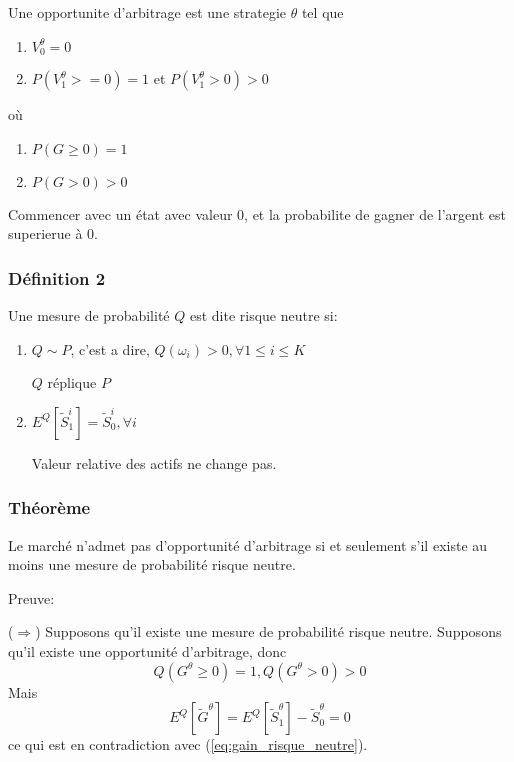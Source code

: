 \documentclass{article}
\theoremstyle{plain}
\theoremstyle{definition}
\begin{document}
Une opportunite d'arbitrage est une strategie $\theta$ tel que 
\begin{enumerate}
	\item  $V_0^\theta =0$
	\item $P(V_1^\theta >=0) = 1$ et $P(V_1^\theta>0)>0$ 
\end{enumerate}
o\`u
\begin{enumerate}
	\item $P(G\geq 0) = 1$
	\item $P(G>0) > 0$
\end{enumerate}

Commencer avec un \'etat avec valeur $0$, et la probabilite de gagner de l'argent est superierue \`a $0$.

\subsubsection{D\'efinition 2}

Une mesure de probabilit\'e $Q$ est dite risque neutre si:
\begin{enumerate}
	\item $Q\sim P$, c'est a dire, $Q(\omega_i)>0, \forall 1\leq i\leq K$
	
	$Q$ r\'eplique $P$
	
	\item $E^Q[\tilde{S}_1^i]=\tilde{S}_0^i, \forall i$
	
	Valeur relative des actifs ne change pas.
\end{enumerate}

\subsubsection{Th\'eor\`eme}
Le march\'e n'admet pas d'opportunit\'e d'arbitrage si et seulement s'il existe au moins une mesure de probabilit\'e risque neutre.

Preuve:

($\Rightarrow$) Supposons qu'il existe une mesure de probabilit\'e risque neutre. Supposons qu'il existe une opportunit\'e d'arbitrage, donc 
\begin{equation}
\label{eq:gain_risque_neutre}
Q(G^\theta\geq0)=1, Q(G^\theta>0)>0
\end{equation}
Mais
\begin{equation}
E^Q[\tilde{G}^\theta]=E^Q[\tilde{S}_1^\theta]-\tilde{S}_0^\theta=0
\end{equation}
ce qui est en contradiction avec (\ref{eq:gain_risque_neutre}).
\end{document}
